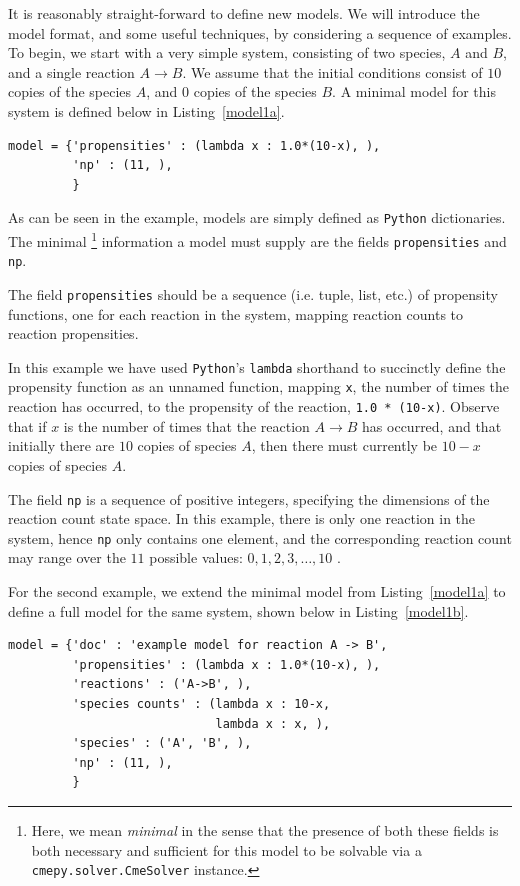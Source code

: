 \documentclass{article}
\newcommand{\mono}[1]{\texttt{#1}}
\newcommand{\python}{\mono{Python}}
\newcommand{\lstref}[1]{Listing~\ref{#1}}
\begin{document}
It is reasonably straight-forward to define new models.
We will introduce the model format, and some useful techniques, by considering a
sequence of examples.
To begin, we start with a very simple system, consisting of two species, $A$
and $B$, and a single reaction $A \rightarrow B$. We assume that the initial
conditions consist of $10$ copies of the species $A$, and $0$ copies of the
species $B$. A minimal model for this system is defined below in
\lstref{model1a}.

\begin{lstlisting}[frame=tb,
caption={A minimal model definition for the system $A \rightarrow B$.},
label=model1a]
model = {'propensities' : (lambda x : 1.0*(10-x), ),
         'np' : (11, ),
         }
\end{lstlisting}

As can be seen in the example, models are simply defined as
\python{} dictionaries. The minimal
\footnote
{
	Here, we mean \emph{minimal} in the sense that the presence of
	both these fields is both necessary and sufficient
	for this model to be solvable via a
	\mono{cmepy.solver.CmeSolver}
	instance.
}
information a model must supply
are the fields \mono{propensities} and \mono{np}.

The field \mono{propensities}
should be a sequence (i.e. tuple, list, etc.) of propensity functions, one
for each reaction in the system, mapping reaction counts to reaction
propensities.

In this example we have used \python{}'s \mono{lambda}
shorthand to succinctly define the propensity function as an unnamed function,
mapping \mono{x}, the number of times the reaction has occurred, to the
propensity of the reaction, \mono{1.0 * (10-x)}. Observe that if $x$ is the
number of times that the reaction $A \rightarrow B$ has occurred, and that
initially there are $10$ copies of species $A$, then there must currently be $10-x$ copies of
species $A$.

The field \mono{np} is a sequence of positive integers,
specifying the dimensions of the reaction count state space. In this example,
there is only one reaction in the system, hence \mono{np} only contains one
element, and the corresponding reaction count may range over the $11$ possible
values: $0, 1, 2, 3, \ldots, 10$ .

For the second example, we extend the minimal model from \lstref{model1a}
to define a full model for the same system, shown below in \lstref{model1b}.

\begin{lstlisting}[frame=tb,
caption={A full model definition for the system $A \rightarrow B$.},
label=model1b]
model = {'doc' : 'example model for reaction A -> B',
         'propensities' : (lambda x : 1.0*(10-x), ),
         'reactions' : ('A->B', ),
         'species counts' : (lambda x : 10-x,
                             lambda x : x, ),
         'species' : ('A', 'B', ),
         'np' : (11, ),
         }
\end{lstlisting}
\end{document}
